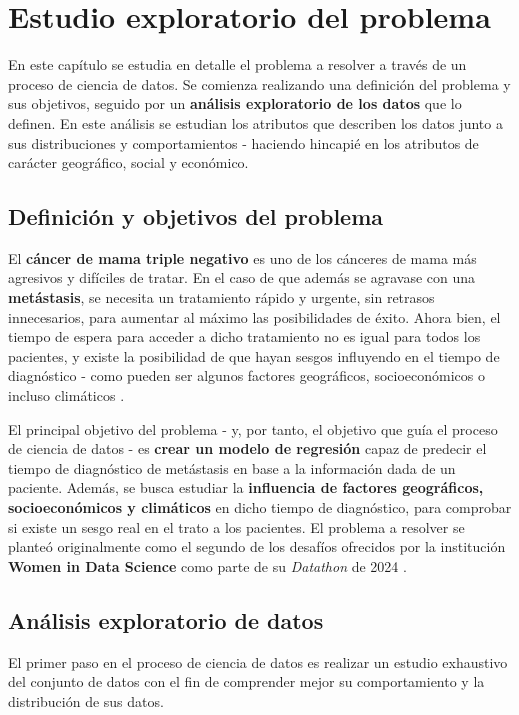 \chapter{Estudio exploratorio del problema}

En este capítulo se estudia en detalle el problema a resolver a través de un proceso de ciencia de datos. Se comienza realizando una definición del problema y sus objetivos, seguido por un \textbf{análisis exploratorio de los datos} que lo definen. En este análisis se estudian los atributos que describen los datos junto a sus distribuciones y comportamientos - haciendo hincapié en los atributos de carácter geográfico, social y económico.

\section{Definición y objetivos del problema}

El \textbf{cáncer de mama triple negativo} es uno de los cánceres de mama más agresivos y difíciles de tratar. En el caso de que además se agravase con una \textbf{metástasis}, se necesita un tratamiento rápido y urgente, sin retrasos innecesarios, para aumentar al máximo las posibilidades de éxito. Ahora bien, el tiempo de espera para acceder a dicho tratamiento no es igual para todos los pacientes, y existe la posibilidad de que hayan sesgos influyendo en el tiempo de diagnóstico - como pueden ser algunos factores geográficos, socioeconómicos o incluso climáticos \cite{widsdatathon2024-challenge2}.

El principal objetivo del problema - y, por tanto, el objetivo que guía el proceso de ciencia de datos - es \textbf{crear un modelo de regresión} capaz de predecir el tiempo de diagnóstico de metástasis en base a la información dada de un paciente. Además, se busca estudiar la \textbf{influencia de factores geográficos, socioeconómicos y climáticos} en dicho tiempo de diagnóstico, para comprobar si existe un sesgo real en el trato a los pacientes.
El problema a resolver se planteó originalmente como el segundo de los desafíos ofrecidos por la institución \textbf{Women in Data Science} como parte de su \textit{Datathon} de 2024 \cite{widsdatathon2024-challenge2}.

\section{Análisis exploratorio de datos}

El primer paso en el proceso de ciencia de datos es realizar un estudio exhaustivo del conjunto de datos con el fin de comprender mejor su comportamiento y la distribución de sus datos.

